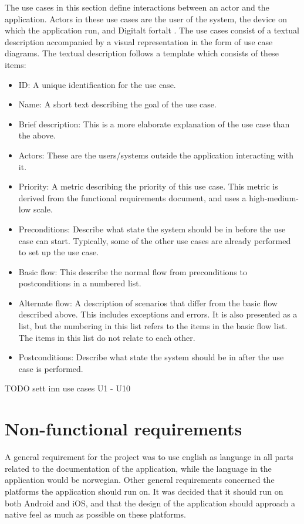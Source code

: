 The use cases in this section define interactions between an actor and the application. Actors in these use cases are the user of the system, the device on which the application run, and Digitalt fortalt . The use cases consist of a textual description accompanied by a visual representation in the form of use case diagrams. The textual description follows a template which consists of these items:
\begin{itemize}
\item ID: A unique identification for the use case.
\item Name: A short text describing the goal of the use case.
\item Brief description: This is a more elaborate explanation of the use case than the above.
\item Actors: These are the users/systems outside the application interacting with it.
\item Priority: A metric describing the priority of this use case. This metric is derived from the functional requirements document, and uses a high-medium-low scale.
\item Preconditions: Describe what state the system should be in before the use case can start. Typically, some of the other use cases are already performed to set up the use case.
\item Basic flow: This describe the normal flow from preconditions to postconditions in a numbered list.
\item Alternate flow: A description of scenarios that differ from the basic flow described above. This includes exceptions and errors. It is also presented as a list, but the numbering in this list refers to the items in the basic flow list. The items in this list do not relate to each other.
\item Postconditions: Describe what state the system should be in after the use case is performed.
\end{itemize}

TODO sett inn use cases U1 - U10\newline

\section{Non-functional requirements}

A general requirement for the project was to use english as language in all parts related to the documentation of the application, while the language in the application would be norwegian. Other general requirements concerned the platforms the application should run on. It was decided that it should run on both Android and iOS, and that the design of the application should approach a native feel as much as possible on these platforms.\newline

